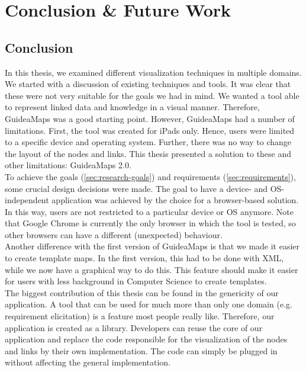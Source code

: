 \chapter{Conclusion \& Future Work}\label{ch:conclusion-future-work}

\section{Conclusion}\label{sec:conclusion}
In this thesis, we examined different visualization techniques in multiple domains. We started with a discussion of existing techniques and tools. It was clear that these were not very suitable for the goals we had in mind. We wanted a tool able to represent linked data and knowledge in a visual manner. Therefore, GuideaMaps was a good starting point. However, GuideaMaps had a number of limitations. First, the tool was created for iPads only. Hence, users were limited to a specific device and operating system. Further, there was no way to change the layout of the nodes and links. This thesis presented a solution to these and other limitations: GuideaMaps 2.0.\\

To achieve the goals (\autoref{sec:research-goals}) and requirements (\autoref{sec:requirements}), some crucial design decisions were made. The goal to have a device- and OS-independent application was achieved by the choice for a browser-based solution. In this way, users are not restricted to a particular device or OS anymore. Note that Google Chrome is currently the only browser in which the tool is tested, so other browsers can have a different (unexpected) behaviour.\\

Another difference with the first version of GuideaMaps is that we made it easier to create template maps. In the first version, this had to be done with XML, while we now have a graphical way to do this. This feature should make it easier for users with less background in Computer Science to create templates.\\

The biggest contribution of this thesis can be found in the genericity of our application. A tool that can be used for much more than only one domain (e.g. requirement elicitation) is a feature most people really like. Therefore, our application is created as a library. Developers can reuse the core of our application and replace the code responsible for the visualization of the nodes and links by their own implementation. The code can simply be plugged in without affecting the general implementation.\\

